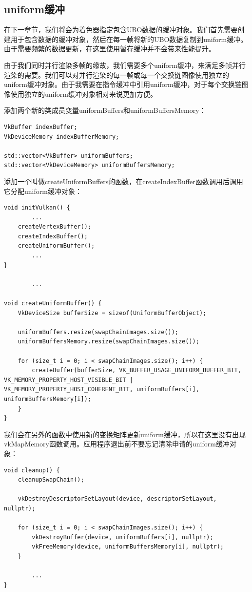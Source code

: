 \documentclass{ctexart}
\begin{document}
\subsection{uniform缓冲}

在下一章节，我们将会为着色器指定包含UBO数据的缓冲对象。我们首先需要创建用于包含数据的缓冲对象，然后在每一帧将新的UBO数据复制到uniform缓冲。由于需要频繁的数据更新，在这里使用暂存缓冲并不会带来性能提升。

由于我们同时并行渲染多帧的缘故，我们需要多个uniform缓冲，来满足多帧并行渲染的需要。我们可以对并行渲染的每一帧或每一个交换链图像使用独立的uniform缓冲对象。由于我需要在指令缓冲中引用uniform缓冲，对于每个交换链图像使用独立的uniform缓冲对象相对来说更加方便。

添加两个新的类成员变量uniformBuffers和uniformBuffersMemory：

\begin{lstlisting}[language={[ANSI]C}]
VkBuffer indexBuffer;
VkDeviceMemory indexBufferMemory;

std::vector<VkBuffer> uniformBuffers;
std::vector<VkDeviceMemory> uniformBuffersMemory;
\end{lstlisting}

添加一个叫做createUniformBuffers的函数，在createIndexBuffer函数调用后调用它分配uniform缓冲对象：

\begin{lstlisting}[language={[ANSI]C}]
void initVulkan() {
		...
	createVertexBuffer();
	createIndexBuffer();
	createUniformBuffer();
		...
}

		...

void createUniformBuffer() {
	VkDeviceSize bufferSize = sizeof(UniformBufferObject);

	uniformBuffers.resize(swapChainImages.size());
	uniformBuffersMemory.resize(swapChainImages.size());

	for (size_t i = 0; i < swapChainImages.size(); i++) {
		createBuffer(bufferSize, VK_BUFFER_USAGE_UNIFORM_BUFFER_BIT, VK_MEMORY_PROPERTY_HOST_VISIBLE_BIT | VK_MEMORY_PROPERTY_HOST_COHERENT_BIT, uniformBuffers[i], uniformBuffersMemory[i]);
	}
}
\end{lstlisting}

我们会在另外的函数中使用新的变换矩阵更新uniform缓冲，所以在这里没有出现vkMapMemory函数调用。应用程序退出前不要忘记清除申请的uniform缓冲对象：

\begin{lstlisting}[language={[ANSI]C}]
void cleanup() {
	cleanupSwapChain();

	vkDestroyDescriptorSetLayout(device, descriptorSetLayout, nullptr);

	for (size_t i = 0; i < swapChainImages.size(); i++) {
		vkDestroyBuffer(device, uniformBuffers[i], nullptr);
		vkFreeMemory(device, uniformBuffersMemory[i], nullptr);
	}

		...
}
\end{lstlisting}
\end{document}
